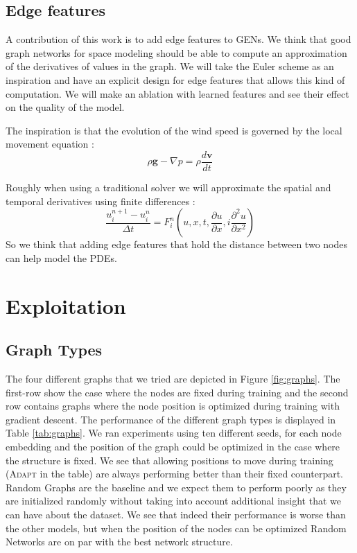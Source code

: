 \documentclass[a4paper,10pt]{article}
\begin{document}
\subsection{Edge features}
A contribution of this work is to add edge features to GENs. We think that good graph networks for space modeling should be able to compute an approximation of the derivatives of values in the graph. We will take the Euler scheme as an inspiration and have an explicit design for edge features that allows this kind of computation. We will make an ablation with learned features and see their effect on the quality of the model.

The inspiration is that the evolution of the wind speed is governed by the local movement equation \cite{meister2004fluids}:
\begin{equation}
  \rho \mathbf{g} - \nabla p = \rho\frac{d\mathbf{v}}{dt}
\end{equation}

Roughly when using a traditional solver we will approximate the spatial and temporal derivatives using finite differences \cite{wiki:cranknicolson}:
\begin{equation}
  \frac{u_{i}^{n + 1} - u_i^{n}}{\Delta t} = F_{i}^{n}(u,x,t, \frac{\partial u}{\partial x}, i\frac{\partial^2 u}{\partial x^{2}}    )
\end{equation}
So we think that adding edge features that hold the distance between two nodes can help model the PDEs.


\section{Exploitation}

\subsection{Graph Types}

The four different graphs that we tried are depicted in Figure \ref{fig:graphs}. The first-row show the case where the nodes are fixed during training and the second row contains graphs where the node position is optimized during training with gradient descent.
The performance of the different graph types is displayed in Table \ref{tab:graphs}. We ran experiments using ten different seeds, for each node embedding and the position of the graph could be optimized in the case where the structure is fixed.
We see that allowing positions to move during training (\textsc{Adapt} in the table) are always performing better than their fixed counterpart. Random Graphs are the baseline and we expect them to perform poorly as they are initialized randomly without taking into account additional insight that we can have about the dataset. We see that indeed their performance is worse than the other models, but when the position of the nodes can be optimized Random Networks are on par with the best network structure.
\end{document}
